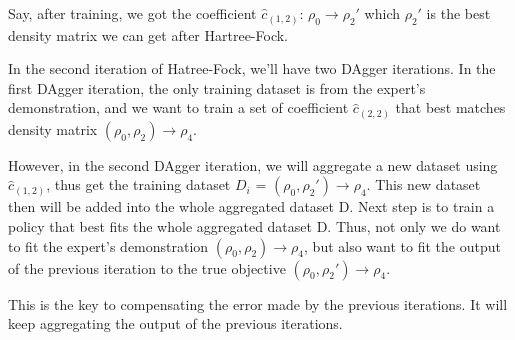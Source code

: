 \documentclass[twoside]{article}
\begin{document}
Say, after training, we got the coefficient $\hat{c}_{(1,2)}$: $\rho_0 \rightarrow \rho_{2}'$ which $\rho_2'$ is the best density matrix we can get after Hartree-Fock.


In the second iteration of Hatree-Fock, we'll have two DAgger iterations. In the first DAgger iteration, the only training dataset is from the expert's demonstration, and we want to train a set of coefficient  $\hat{c}_{(2,2)}$ that best matches density matrix $(\rho_0,\rho_2) \rightarrow \rho_4$.

However, in the second DAgger iteration, we will aggregate a new dataset using $\hat{c}_{(1,2)}$, thus get the training dataset $D_i$ = $(\rho_0, \rho_2') \rightarrow \rho_4$. This new dataset then will be added into the whole aggregated dataset D.
Next step is to train a policy that best fits the whole aggregated dataset D. Thus, not only we do want to fit the expert's demonstration $(\rho_0, \rho_2) \rightarrow \rho_4$, but also want to fit the output of the previous iteration to the true objective $ (\rho_0,\rho_{2}') \rightarrow \rho_4$. 


This is the key to compensating the error made by the previous iterations. It will keep aggregating the output of the previous iterations.





\end{document}

